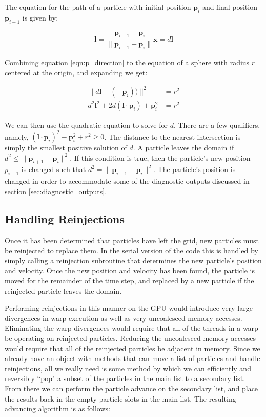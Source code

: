 The equation for the path of a particle with initial position $\mathbf{p}_i$ and final position $\mathbf{p}_{i+1}$ is given by;

\begin{equation}
 \mathbf{l} = \frac{\mathbf{p}_{i+1} - \mathbf{p}_{i}}{\|\mathbf{p}_{i+1} - \mathbf{p}_{i}\|}
\mathbf{x} = d\mathbf{l}
\label{eqn:p_direction}
\end{equation}

Combining equation \ref{eqn:p_direction} to the equation of a sphere with radius $r$ centered at the origin, and expanding we get:

\begin{equation}
\begin{aligned}
\|d\mathbf{l} - (-\mathbf{p}_i)) \|^2  &= r^2 \\
d^2\mathbf{l}^2 + 2d(\mathbf{l}\cdot \mathbf{p}_i) + \mathbf{p}_i^2 &= r^2
		\end{aligned}
\end{equation}

We can then use the quadratic equation to solve for $d$. There are a few qualifiers, namely, $(\mathbf{l}\cdot \mathbf{p}_i)^2 - \mathbf{p}_i^2 + r^2 \geq 0$. The distance to the nearest intersection is simply the smallest positive solution of $d$. A particle leaves the domain if $d^2 \le \|\mathbf{p}_{i+1} - \mathbf{p}_{i}\|^2$. If this condition is true, then the particle's new position $p_{i+1}$ is changed such that $d^2 = \|\mathbf{p}_{i+1} - \mathbf{p}_{i}\|^2$. The particle's position is changed in order to accommodate some of the diagnostic outputs discussed in section \ref{sec:diagnostic_outputs}. 



		\subsection{Handling Reinjections}
Once it has been determined that particles have left the grid, new particles must be reinjected to replace them. In the serial version of the code this is handled by simply calling a reinjection subroutine that determines the new particle's position and velocity. Once the new position and velocity has been found, the particle is moved for the remainder of the time step, and replaced by a new particle if the reinjected particle leaves the domain.  

Performing reinjections in this manner on the GPU would introduce very large divergences in warp execution as well as very uncoalesced memory accesses. Eliminating the warp divergences would require that all of the threads in a warp be operating on reinjected particles. Reducing the uncoalesced memory accesses would require that all of the reinjected particles be adjacent in memory.  Since we already have an object with methods that can move a list of particles and handle reinjections, all we really need is some method by which we can efficiently and reversibly ``pop" a subset of the particles in the main list to a secondary list. From there we can perform the particle advance on the secondary list, and place the results back in the empty particle slots in the main list. The resulting advancing algorithm is as follows:

